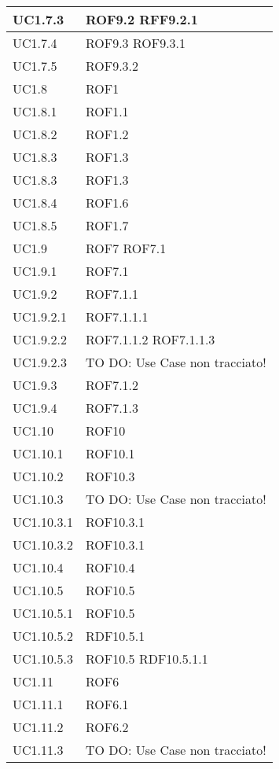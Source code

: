 \begin{center}
\begin{longtable}{| p{4cm} | p{4cm} |}
\hline
UC1.7.3 & ROF9.2 \newline RFF9.2.1 \\
\hline
UC1.7.4 & ROF9.3 \newline ROF9.3.1 \\
\hline
UC1.7.5 & ROF9.3.2 \\
\hline
UC1.8 & ROF1 \\
\hline
UC1.8.1 & ROF1.1 \\
\hline
UC1.8.2 & ROF1.2 \\
\hline
UC1.8.3 & ROF1.3 \\
\hline
UC1.8.3 & ROF1.3 \\
\hline
UC1.8.4 & ROF1.6 \\
\hline
UC1.8.5 & ROF1.7 \\
\hline
UC1.9 & ROF7 \newline ROF7.1 \\
\hline
UC1.9.1 & ROF7.1 \\
\hline
UC1.9.2 & ROF7.1.1 \\
\hline
UC1.9.2.1 & ROF7.1.1.1 \\
\hline
UC1.9.2.2 & ROF7.1.1.2 \newline ROF7.1.1.3 \\
\hline
UC1.9.2.3 & TO DO: Use Case non tracciato! \\
\hline
UC1.9.3 & ROF7.1.2 \\
\hline
UC1.9.4 & ROF7.1.3 \\
\hline
UC1.10 & ROF10 \\
\hline
UC1.10.1 & ROF10.1 \\
\hline
UC1.10.2 & ROF10.3 \\
\hline
UC1.10.3 & TO DO: Use Case non tracciato! \\
\hline
UC1.10.3.1 & ROF10.3.1 \\
\hline
UC1.10.3.2 & ROF10.3.1 \\
\hline
UC1.10.4 & ROF10.4 \\
\hline
UC1.10.5 & ROF10.5 \\
\hline
UC1.10.5.1 & ROF10.5 \\
\hline
UC1.10.5.2 & RDF10.5.1 \\
\hline
UC1.10.5.3 & ROF10.5 \newline RDF10.5.1.1 \\
\hline
UC1.11 & ROF6 \\
\hline
UC1.11.1 & ROF6.1 \\
\hline
UC1.11.2 & ROF6.2 \\
\hline
UC1.11.3 & TO DO: Use Case non tracciato! \\

\end{longtable}
\end{center}
